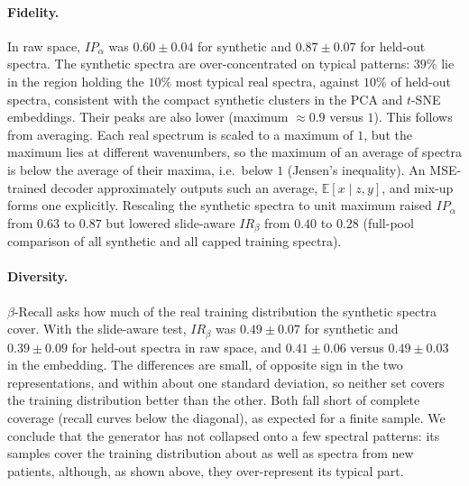 \documentclass[12pt]{article}
\theoremstyle{paper}
\begin{document}
\paragraph{Fidelity.}
In raw space, $IP_\alpha$ was $0.60\pm0.04$ for synthetic and $0.87\pm0.07$ for held-out spectra.
The synthetic spectra are over-concentrated on typical patterns: $39\%$ lie in the region holding
the $10\%$ most typical real spectra, against $10\%$ of held-out spectra, consistent with the compact
synthetic clusters in the PCA and $t$-SNE embeddings. Their peaks are also lower (maximum
$\approx0.9$ versus $1$). This follows from averaging. Each real spectrum is scaled to a maximum of
$1$, but the maximum lies at different wavenumbers, so the maximum of an average of spectra is below
the average of their maxima, i.e.\ below $1$ (Jensen's inequality). An MSE-trained decoder
approximately outputs such an average, $\mathbb{E}[x\mid z,y]$, and mix-up forms one explicitly.
Rescaling the synthetic spectra to unit maximum raised $IP_\alpha$ from $0.63$ to $0.87$ but lowered
slide-aware $IR_\beta$ from $0.40$ to $0.28$ (full-pool comparison of all synthetic and all capped
training spectra).

\paragraph{Diversity.}
$\beta$-Recall asks how much of the real training distribution the synthetic spectra cover. With the
slide-aware test, $IR_\beta$ was $0.49\pm0.07$ for synthetic and $0.39\pm0.09$ for held-out spectra in
raw space, and $0.41\pm0.06$ versus $0.49\pm0.03$ in the embedding. The differences are small, of
opposite sign in the two representations, and within about one standard deviation, so neither set
covers the training distribution better than the other. Both fall short of complete coverage (recall
curves below the diagonal), as expected for a finite sample. We conclude that the generator has not
collapsed onto a few spectral patterns: its samples cover the training distribution about as well
as spectra from new patients, although, as shown above, they over-represent its typical part.
\end{document}
